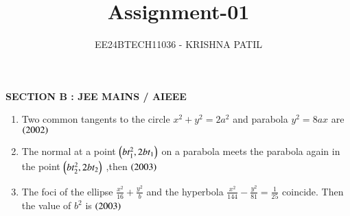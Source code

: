\documentclass[journal,12pt,twocolumn]{IEEEtran}
\theoremstyle{remark}
\begin{document}

\vspace{3cm}

\title{Assignment-01}
\author{EE24BTECH11036 - KRISHNA PATIL}
\maketitle
\newpage
\bigskip

\renewcommand{\thefigure}{\theenumi}
\renewcommand{\thetable}{\theenumi}
\textbf{SECTION B : JEE MAINS / AIEEE}
\hfill
\begin{enumerate}
\item Two common tangents to the circle {$ x^2+y^2=2a^2 $} and parabola {$ y^2 = 8ax $} are \hfill{{$\left(2002\right) $}}
\begin{enumerate}
\end{enumerate}
\hfill
\item The normal at a point {$ \left(bt_1^2 ,2bt_1\right) $} on a parabola meets the parabola again in the point {$ \left(bt_2^2 ,2bt _2\right) $}  ,then \hfill {{$ \left(2003\right) $}}
\begin{enumerate}
\end{enumerate}
\hfill
\item The foci of the ellipse {$ \frac{x^2}{16} + \frac{y^2}{b} $} and the hyperbola {$ \frac{x^2}{144} - \frac{y^2}{81} = \frac{1}{25} $} coincide. Then the value of {$ b^2 $} is 
\hfill{{$ \left(2003\right) $}}
\begin{enumerate}
\end{enumerate}
\end{enumerate}
\end{document}
